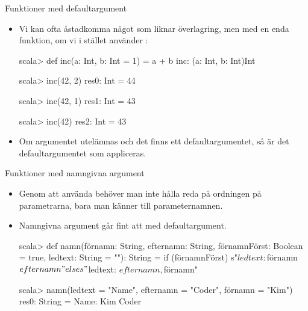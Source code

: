 \begin{Slide}{Funktioner med defaultargument}\SlideFontSmall

\begin{itemize}
\item Vi kan ofta åstadkomma något som liknar överlagring, men med en enda funktion, om vi i stället använder :
\begin{REPLnonum}
scala> def inc(a: Int, b: Int = 1) = a + b
inc: (a: Int, b: Int)Int

scala> inc(42, 2)
res0: Int = 44

scala> inc(42, 1)
res1: Int = 43

scala> inc(42)
res2: Int = 43

\end{REPLnonum}
\item Om argumentet utelämnas och det finns ett defaultargumentet, så är det defaultargumentet som appliceras.
\end{itemize}
\end{Slide} 


\begin{Slide}{Funktioner med namngivna argument}
\begin{itemize}
\item Genom att använda  behöver man inte hålla reda på ordningen på parametrarna, bara man känner till parameternamnen. 
\item Namngivna argument går fint att  med defaultargument.
\begin{REPL}
scala> def namn(förnamn: String, 
                efternamn: String, 
                förnamnFörst: Boolean = true,
                ledtext: String = ""): String = 
         if (förnamnFörst) s"$ledtext: $förnamn $efternamn" 
         else s"$ledtext: $efternamn, $förnamn"

scala> namn(ledtext = "Name", efternamn = "Coder", förnamn = "Kim")
res0: String = Name: Kim Coder
\end{REPL}
\end{itemize}
\end{Slide} 


